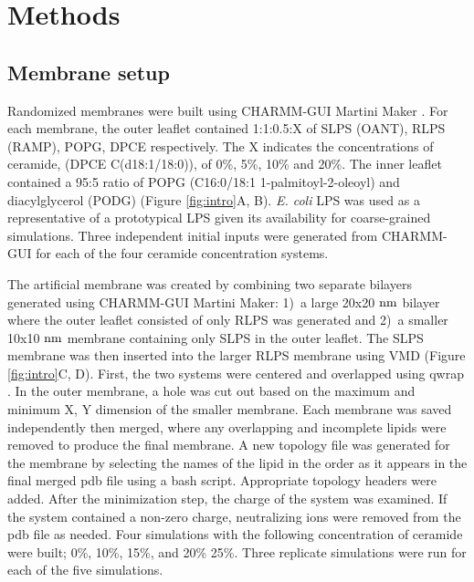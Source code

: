 \documentclass[10pt, letterpaper]{article}
\begin{document}
\newpage
\section{Methods}

\subsection{Membrane setup}
Randomized membranes were built using CHARMM-GUI  Martini Maker \cite{hsu2016molecular, shearer2019outer}. For each membrane, the outer leaflet contained 1:1:0.5:X of SLPS (OANT), RLPS (RAMP), POPG, DPCE respectively. The X indicates the concentrations of ceramide, (DPCE C(d18:1/18:0)), of 0\%, 5\%, 10\% and 20\%.  The inner leaflet contained a 95:5 ratio of POPG (C16:0/18:1 1-palmitoyl-2-oleoyl) and diacylglycerol (PODG) (Figure \ref{fig:intro}A, B). \textit{E. coli} LPS was used as a representative of a prototypical LPS given its availability for coarse-grained simulations. Three independent initial inputs were generated from CHARMM-GUI for each of the four ceramide concentration systems. 

\par The artificial membrane was created by combining two separate bilayers generated using  CHARMM-GUI Martini Maker: 1)~a large 20x20 $\rm nm$ bilayer where the outer leaflet consisted of only  RLPS was generated and 2)~a smaller 10x10 $\rm nm$ membrane containing only SLPS in the outer leaflet. The SLPS membrane was then inserted into the larger RLPS membrane using VMD (Figure \ref{fig:intro}C, D). First, the two systems were centered and overlapped using qwrap \cite{jerome_henin_2020_3877030}. In the outer membrane, a hole was cut out based on the maximum and minimum X, Y dimension of the smaller membrane. Each membrane was saved independently then merged, where any overlapping and incomplete lipids were removed to produce the final membrane.
A new topology file was generated for the membrane by selecting the names of the lipid in the order as it appears in the final merged pdb file using a bash script. Appropriate topology headers were added. After the minimization step, the charge of the system was examined. If the system contained a non-zero charge, neutralizing ions were removed from the pdb file as needed. Four simulations with the following concentration of ceramide were built; 0\%, 10\%, 15\%, and 20\% 25\%. Three replicate simulations were run for each of the five simulations.
\end{document}
